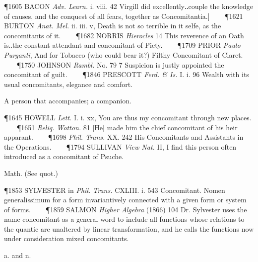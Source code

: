 \begin{description}[wide, labelwidth=!, labelindent=0pt]
\begin{myenumerate}
\P 1605 BACON  \textit{Adv. Learn.} i. viii. 42 Virgill did excellently‥couple the knowledge of causes, and the conquest of all fears, together as Concomitantia.]    
\P 1621 BURTON  \textit{Anat. Mel.} ii. iii. v, Death is not so terrible in it selfe, as the concomitants of it.    
\P 1682 NORRIS  \textit{Hierocles} 14 This reverence of an Oath is‥the constant attendant and concomitant of Piety.    
\P 1709 PRIOR  \textit{Paulo Purganti}, And for Tobacco (who could bear it?) Filthy Concomitant of Claret.    
\P 1750 JOHNSON  \textit{Rambl.} No. 79 7 Suspicion is justly appointed the concomitant of guilt.    
\P 1846 PRESCOTT  \textit{Ferd. \& Is.} I. i. 96 Wealth with its usual concomitants, elegance and comfort.

 A person that accompanies; a companion.

\P 1645 HOWELL  \textit{Lett.} I. i. xx, You are thus my concomitant through new places.    
\P 1651  \textit{Reliq. Wotton.} 81 [He] made him the chief concomitant of his heir apparant.    
\P 1698  \textit{Phil. Trans.} XX. 242 His Concomitants and Assistants in the Operations.    
\P 1794 SULLIVAN  \textit{View Nat.} II, I find this person often introduced as a concomitant of Psuche.

 Math. (See quot.)

\P 1853 SYLVESTER in  \textit{Phil. Trans.} CXLIII. i. 543 Concomitant. Nomen generalissimum for a form invariantively connected with a given form or system of forms.    
\P 1859 SALMON  \textit{Higher Algebra} (1866) 104 Dr. Sylvester uses the name concomitant as a general word to include all functions whose relations to the quantic are unaltered by linear transformation, and he calls the functions now under consideration mixed concomitants.
\end{myenumerate}


 a. and n.

\noindent {}

\vspace{-0.3cm}


\end{description}
